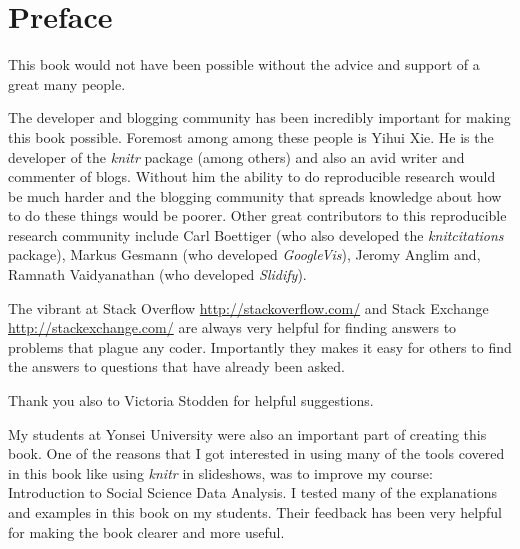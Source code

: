 


\chapter*{Preface}


\noindent This book would not have been possible without the advice and support of a great many people.

The developer and blogging community has been incredibly important for making this book possible. Foremost among among these people is Yihui Xie. He is the developer of the {\emph{knitr}} package (among others) and also an avid writer and commenter of blogs. Without him the ability to do reproducible research would be much harder and the blogging community that spreads knowledge about how to do these things would be poorer. Other great contributors to this reproducible research community include Carl Boettiger (who also developed the {\emph{knitcitations}} package), Markus Gesmann (who developed {\emph{GoogleVis}}), Jeromy Anglim and, Ramnath Vaidyanathan (who developed {\emph{Slidify}}).

The vibrant at Stack Overflow \url{http://stackoverflow.com/} and Stack Exchange \url{http://stackexchange.com/} are always very helpful for finding answers to problems that plague any coder. Importantly they makes it easy for others to find the answers to questions that have already been asked.

Thank you also to Victoria Stodden for helpful suggestions.

My students at Yonsei University were also an important part of creating this book. One of the reasons that I got interested in using many of the tools covered in this book like using {\emph{knitr}} in slideshows, was to improve my course: Introduction to Social Science Data Analysis. I tested many of the explanations and examples in this book on my students. Their feedback has been very helpful for making the book clearer and more useful.
